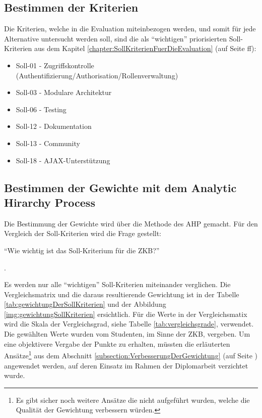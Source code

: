   \subsection{Bestimmen der Kriterien}
  
  Die Kriterien, welche in die Evaluation miteinbezogen werden, und somit für
  jede Alternative untersucht werden soll, sind die als ``wichtigen''
  priorisierten Soll-Kriterien aus dem Kapitel
  \ref{chapter:SollKriterienFuerDieEvaluation}
   (auf Seite
  \pageref{chapter:SollKriterienFuerDieEvaluation}ff):
  
  \begin{itemize}
    \item Soll-01 - Zugriffskontrolle 
    (Authentifizierung/Authorisation/Rollenverwaltung)
    \item Soll-03 - Modulare Architektur
    \item Soll-06 - Testing
    \item Soll-12 - Dokumentation
    \item Soll-13 - Community
    \item Soll-18 - AJAX-Unterstützung
  \end{itemize}
  
  \subsection{Bestimmen der Gewichte mit dem Analytic Hirarchy Process}
  
  Die Bestimmung der Gewichte wird über die Methode des \ac{AHP} gemacht. Für
  den Vergleich der Soll-Kriterien wird die Frage gestellt:
  \begin{itshape}``Wie wichtig ist das Soll-Kriterium für die
  \ac{ZKB}?''\end{itshape}.
  
  Es werden nur alle ``wichtigen'' Soll-Kriterien miteinander verglichen. Die
  Vergleichsmatrix und die daraus resultierende Gewichtung ist in der Tabelle
  \ref{tab:gewichtungDerSollKriterien} und der Abbildung
  \ref{img:gewichtungSollKriterien} ersichtlich. Für die Werte in der
  Vergleichsmatix wird die Skala der Vergleichsgrad, siehe Tabelle
  \ref{tab:vergleichsgrade}, verwendet. Die gewählten Werte wurden vom
  Studenten, im Sinne der \ac{ZKB}, vergeben. Um eine objektivere Vergabe der
  Punkte zu erhalten, müssten die erläuterten Ansätze\footnote{Es gibt sicher
  noch weitere Ansätze die nicht aufgeführt wurden, welche die Qualität der
  Gewichtung verbessern würden.} aus dem Abschnitt
  \ref{subsection:VerbesserungDerGewichtung}
   (auf Seite
  \pageref{subsection:VerbesserungDerGewichtung}) angewendet werden, auf deren
  Einsatz im Rahmen der Diplomarbeit verzichtet wurde.
  
